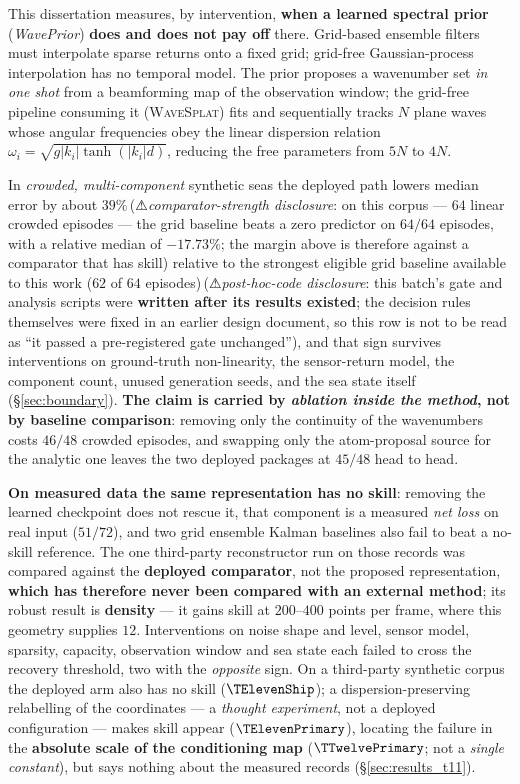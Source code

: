 \documentclass[11pt]{report}
\numberwithin{equation}{chapter}
\numberwithin{figure}{chapter}
\numberwithin{table}{chapter}
\newcommand{\WS}{\textsc{WaveSplat}}
\newcommand{\BOnePostHocEN}{\,(⚠\emph{post-hoc-code disclosure}: this batch's gate
  and analysis scripts were \textbf{written after its results existed}; the decision
  rules themselves were fixed in an earlier design document, so this row is not to be
  read as ``it passed a pre-registered gate unchanged'')}
\newcommand{\CmpSkillBOneEN}{\,(⚠\emph{comparator-strength disclosure}: on this
  corpus --- $64$ linear crowded episodes --- the grid baseline beats a zero predictor
  on $64/64$ episodes, with a relative median of $-17.73\%$; the margin above is
  therefore against a comparator that has skill)}
\begin{document}
This dissertation measures, by intervention, \textbf{when a learned spectral prior}
(\emph{WavePrior}) \textbf{does and does not pay off} there. Grid-based ensemble filters
must interpolate sparse returns onto a fixed grid; grid-free Gaussian-process
interpolation has no temporal model. The prior proposes a wavenumber set \emph{in one
shot} from a beamforming map of the observation window; the grid-free pipeline consuming
it (\WS{}) fits and sequentially tracks $N$ plane waves whose angular frequencies obey
the linear dispersion relation $\omega_i = \sqrt{g|k_i|\tanh(|k_i|d)}$, reducing the free
parameters from $5N$ to $4N$.

In \emph{crowded, multi-component} synthetic seas the deployed path lowers median error
by about $39\%$\CmpSkillBOneEN{} relative to the strongest eligible grid baseline
available to this work ($62$ of $64$ episodes)\BOnePostHocEN{}, and that sign survives
interventions on ground-truth non-linearity, the sensor-return model, the component
count, unused generation seeds, and the sea state itself (\S\ref{sec:boundary}).
\textbf{The claim is carried by \emph{ablation inside the method}, not by baseline
comparison}: removing only the continuity of the wavenumbers costs $46/48$ crowded
episodes, and swapping only the atom-proposal source for the analytic one leaves the two
deployed packages at $45/48$ head to head.

\textbf{On measured data the same representation has no skill}: removing the learned
checkpoint does not rescue it, that component is a measured \emph{net loss} on real
input ($51/72$), and two grid ensemble Kalman baselines also fail to beat a no-skill reference. The one third-party
reconstructor run on those records was compared against the \textbf{deployed
comparator}, not the proposed representation, \textbf{which has therefore never been
compared with an external method}; its robust result is \textbf{density} --- it gains
skill at $200$--$400$ points per frame, where this geometry supplies $12$. Interventions
on noise shape and level, sensor model, sparsity, capacity, observation window and sea
state each failed to cross the recovery threshold, two with the \emph{opposite} sign.
On a third-party synthetic corpus the deployed arm also has no skill
($\TElevenShip$); a dispersion-preserving relabelling of the coordinates --- a \emph{thought experiment}, not a deployed configuration --- makes
skill appear ($\TElevenPrimary$), locating the failure in the \textbf{absolute scale of
the conditioning map} ($\TTwelvePrimary$; not a \emph{single constant}), but says
nothing about the measured records (\S\ref{sec:results_t11}).
\end{document}
